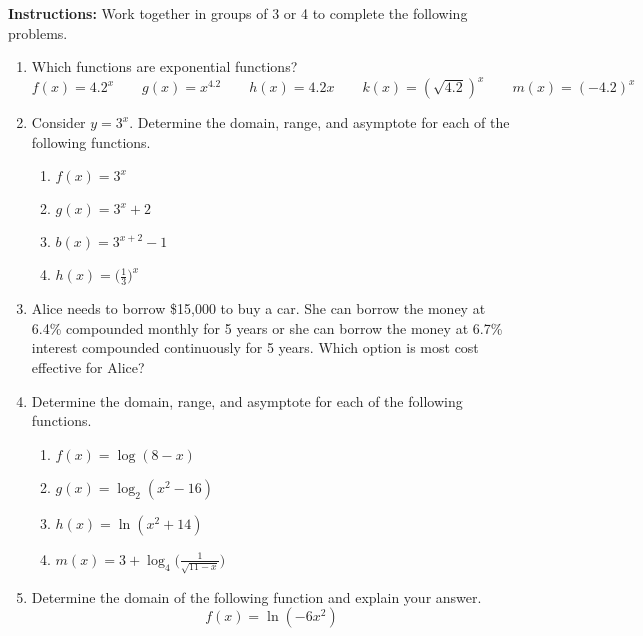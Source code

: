 


\noindent \textbf{Instructions:}  Work together in groups of  3 or 4 to complete the following problems.



\begin{enumerate}

\item Which functions are exponential functions?
$$f(x)=4.2^x \quad \quad g(x)=x^{4.2} \quad \quad h(x)=4.2x \quad \quad k(x)=(\sqrt{4.2})^x \quad \quad m(x)=(-4.2)^x$$

\item Consider $y=3^x$.  Determine the domain, range, and asymptote for each of the following functions.

\begin{enumerate}
\item $f(x)=3^x$\vfill
\item $g(x)=3^x+2$\vfill
\item $b(x)=3^{x+2}-1$\vfill


\item  $\displaystyle h(x)=\Big(\frac{1}{3}\Big)^x$
\vfill


\end{enumerate}

\item Alice needs to borrow \$15,000 to buy a car.  She can borrow the money at 6.4\% compounded monthly for 5 years or she can borrow the money at 6.7\% interest compounded continuously for 5 years.  Which option is most cost effective for Alice?

\vfill
\vfill

\newpage

\item Determine the domain, range, and asymptote for each of the following functions.
\begin{enumerate}
\item $f(x)=\log(8-x)$ 
\vfill
\item $g(x)=\log_2 (x^2-16)$ 
\vfill
\vfill
\item $h(x)=\ln(x^2+14)$
\vfill
\item $\displaystyle m(x)=3+\log_4\Bigg(\frac{1}{\sqrt{11-x}}\Bigg)$
\vfill
\end{enumerate}

\item Determine the domain of the following function and explain your answer. $$f(x)=\ln(-6x^2)$$
\vfill
\newpage


\end{enumerate}
